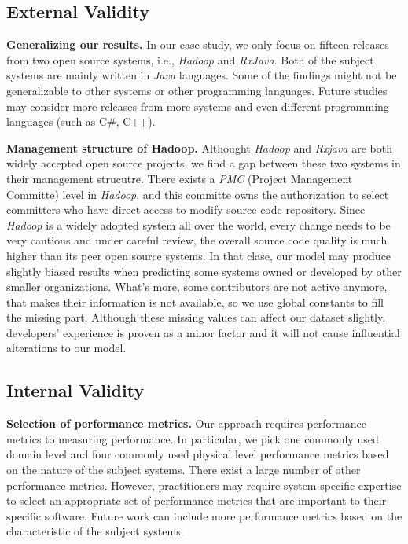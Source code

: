 \subsection{External Validity}

\textbf{Generalizing our results. }In our case study, we only focus on fifteen releases from two open source systems, i.e., \emph{Hadoop} and \emph{RxJava}. Both of the subject systems are mainly written in \emph{Java} languages. Some of the findings might not be generalizable to other systems or other programming languages. Future studies may consider more releases from more systems and even different programming languages (such as C\#, C++). 

\textbf{Management structure of Hadoop.} Althought \emph{Hadoop} and \emph{Rxjava} are both widely accepted open source projects, we find a gap between these two systems in their management strucutre. There exists a \emph{PMC} (Project Management Committe) level in \emph{Hadoop}, and this committe owns the authorization to select committers who have direct access to modify source code repository. Since \emph{Hadoop} is a widely adopted system all over the world, every change needs to be very cautious and under careful review, the overall source code quality is much higher than its peer open source systems. In that clase, our model may produce slightly biased results when predicting some systems owned or developed by other smaller organizations. What's more, some contributors are not active anymore, that makes their information is not available, so we use global constants to fill the missing part. Although these missing values can affect our dataset slightly, developers' experience is proven as a minor factor and it will not cause influential alterations to our model.

\subsection{Internal Validity}

\textbf{Selection of performance metrics.} Our approach requires performance metrics to measuring performance. In particular, we pick one commonly used domain level and four commonly used physical level performance metrics based on the nature of the subject systems. There exist a large number of other performance metrics. However, practitioners may require system-specific expertise to select an appropriate set of performance metrics that are important to their specific software. Future work can include more performance metrics based on the characteristic of the subject systems. 


